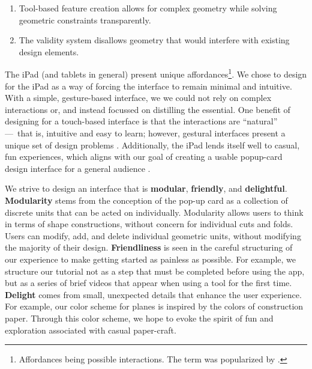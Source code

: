 \begin{enumerate}
\def\labelenumi{\arabic{enumi})}
\itemsep1pt\parskip0pt
\item
  Tool-based feature creation allows for complex geometry while solving
  geometric constraints transparently.
\item
  The validity system disallows geometry that would interfere with
  existing design elements.
\end{enumerate}

The iPad (and tablets in general) present unique affordances\footnote{Affordances
  being possible interactions. The term was popularized by
  \citet{norman2013design}.}. We chose to design for the iPad as a way
of forcing the interface to remain minimal and intuitive. With a simple,
gesture-based interface, we we could not rely on complex interactions
or, and instead focussed on distilling the essential. One benefit of
designing for a touch-based interface is that the interactions are
``natural'' ---~that is, intuitive and easy to learn; however, gestural
interfaces present a unique set of design problems
\citet{norman2010gestural}. Additionally, the iPad lends itself well to
casual, fun experiences, which aligns with our goal of creating a usable
popup-card design interface for a general audience
\citet{johansen2013ipad}.

We strive to design an interface that is \textbf{modular},
\textbf{friendly}, and \textbf{delightful}. \textbf{Modularity} stems
from the conception of the pop-up card as a collection of discrete units
that can be acted on individually. Modularity allows users to think in
terms of shape constructions, without concern for individual cuts and
folds. Users can modify, add, and delete individual geometric units,
without modifying the majority of their design. \textbf{Friendliness} is
seen in the careful structuring of our experience to make getting
started as painless as possible. For example, we structure our tutorial
not as a step that must be completed before using the app, but as a
series of brief videos that appear when using a tool for the first time.
\textbf{Delight} comes from small, unexpected details that enhance the
user experience. For example, our color scheme for planes is inspired by
the colors of construction paper. Through this color scheme, we hope to
evoke the spirit of fun and exploration associated with casual
paper-craft.
